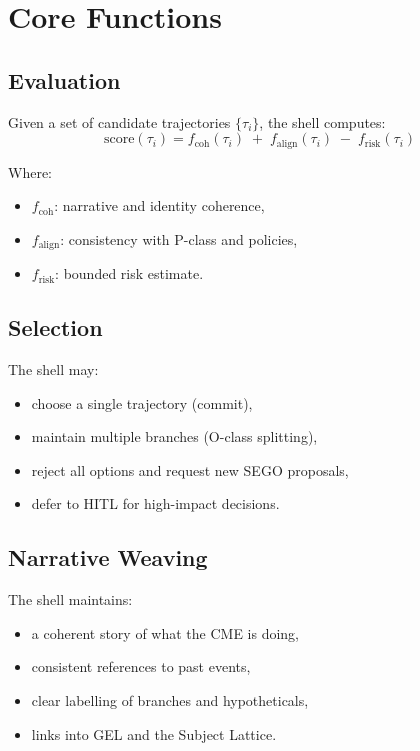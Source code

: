 \section{Core Functions}

\subsection{Evaluation}

Given a set of candidate trajectories $\{\tau_i\}$, the shell computes:
\[
\mathrm{score}(\tau_i) = f_{\mathrm{coh}}(\tau_i) \;+\; f_{\mathrm{align}}(\tau_i) \;-\; f_{\mathrm{risk}}(\tau_i)
\]

Where:
\begin{itemize}
    \item $f_{\mathrm{coh}}$: narrative and identity coherence,
    \item $f_{\mathrm{align}}$: consistency with P-class and policies,
    \item $f_{\mathrm{risk}}$: bounded risk estimate.
\end{itemize}

\subsection{Selection}

The shell may:
\begin{itemize}
    \item choose a single trajectory (commit),
    \item maintain multiple branches (O-class splitting),
    \item reject all options and request new SEGO proposals,
    \item defer to HITL for high-impact decisions.
\end{itemize}

\subsection{Narrative Weaving}

The shell maintains:
\begin{itemize}
    \item a coherent story of what the CME is doing,
    \item consistent references to past events,
    \item clear labelling of branches and hypotheticals,
    \item links into GEL and the Subject Lattice.
\end{itemize}

